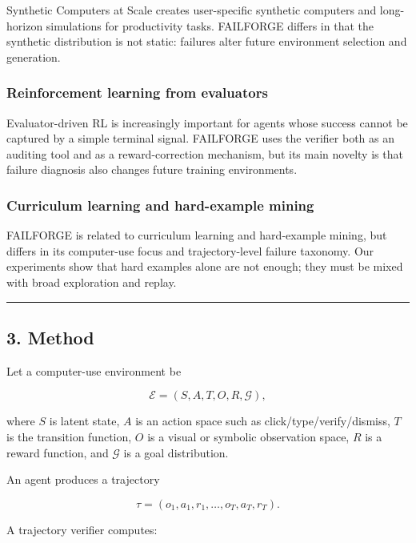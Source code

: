 \documentclass[
]{article}
\begin{document}
Synthetic Computers at Scale creates user-specific synthetic computers
and long-horizon simulations for productivity tasks. FAILFORGE differs
in that the synthetic distribution is not static: failures alter future
environment selection and generation.

\subsubsection{Reinforcement learning from
evaluators}\label{reinforcement-learning-from-evaluators}

Evaluator-driven RL is increasingly important for agents whose success
cannot be captured by a simple terminal signal. FAILFORGE uses the
verifier both as an auditing tool and as a reward-correction mechanism,
but its main novelty is that failure diagnosis also changes future
training environments.

\subsubsection{Curriculum learning and hard-example
mining}\label{curriculum-learning-and-hard-example-mining}

FAILFORGE is related to curriculum learning and hard-example mining, but
differs in its computer-use focus and trajectory-level failure taxonomy.
Our experiments show that hard examples alone are not enough; they must
be mixed with broad exploration and replay.

\begin{center}\rule{0.5\linewidth}{0.5pt}\end{center}

\subsection{3. Method}\label{method}

Let a computer-use environment be

\[ \mathcal{E}=(S,A,T,O,R,\mathcal{G}), \]

where $S$ is latent state, $A$ is an action space such as
click/type/verify/dismiss, $T$ is the transition function, $O$ is a
visual or symbolic observation space, $R$ is a reward function, and
$\mathcal{G}$ is a goal distribution.

An agent produces a trajectory

\[ \tau=(o_1,a_1,r_1,\ldots,o_T,a_T,r_T). \]

A trajectory verifier computes:
\end{document}
